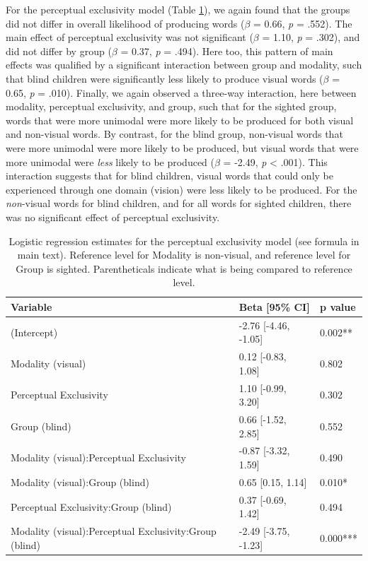 \documentclass[
  man,floatsintext]{apa6}
\begin{document}
For the perceptual exclusivity model (Table \ref{tab:excl-table}), we again found that the groups did not differ in overall likelihood of producing words (\(\beta\) = 0.66, \emph{p} = .552). The main effect of perceptual exclusivity was not significant (\(\beta\) = 1.10, \emph{p} = .302), and did not differ by group (\(\beta\) = 0.37, \emph{p} = .494). Here too, this pattern of main effects was qualified by a significant interaction between group and modality, such that blind children were significantly less likely to produce visual words (\(\beta\) = 0.65, \emph{p} = .010). Finally, we again observed a three-way interaction, here between modality, perceptual exclusivity, and group, such that for the sighted group, words that were more unimodal were more likely to be produced for both visual and non-visual words. By contrast, for the blind group, non-visual words that were more unimodal were more likely to be produced, but visual words that were more unimodal were \emph{less} likely to be produced (\(\beta\) = -2.49, \emph{p} \textless{} .001). This interaction suggests that for blind children, visual words that could only be experienced through one domain (vision) were less likely to be produced. For the \emph{non}-visual words for blind children, and for all words for sighted children, there was no significant effect of perceptual exclusivity.

\begin{table}[H]

\caption{\label{tab:excl-table}Logistic regression estimates for the perceptual exclusivity model (see formula in main text). Reference level for Modality is non-visual, and reference level for Group is sighted. Parentheticals indicate what is being compared to reference level.}
\centering
\begin{tabular}[t]{l|l|l}
\hline
Variable & Beta [95\% CI] & p value\\
\hline
(Intercept) & -2.76 [-4.46, -1.05] & 0.002**\\
\hline
Modality (visual) & 0.12 [-0.83, 1.08] & 0.802\\
\hline
Perceptual Exclusivity & 1.10 [-0.99, 3.20] & 0.302\\
\hline
Group (blind) & 0.66 [-1.52, 2.85] & 0.552\\
\hline
Modality (visual):Perceptual Exclusivity & -0.87 [-3.32, 1.59] & 0.490\\
\hline
Modality (visual):Group (blind) & 0.65 [0.15, 1.14] & 0.010*\\
\hline
Perceptual Exclusivity:Group (blind) & 0.37 [-0.69, 1.42] & 0.494\\
\hline
Modality (visual):Perceptual Exclusivity:Group (blind) & -2.49 [-3.75, -1.23] & 0.000***\\
\hline
\end{tabular}
\end{table}
\end{document}

